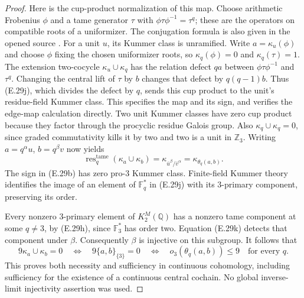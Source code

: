 \begin{proof}
Here is the cup-product normalization of this map.
Choose arithmetic Frobenius $\phi$ and a tame generator
$\tau$ with $\phi\tau\phi^{-1}=\tau^q$; these are the
operators on compatible roots of a uniformizer. The
conjugation formula is also given in the opened source
\cite[(8.2.2)]{E_BrinonConrad}.
For a unit $u$, its Kummer class is unramified. Write
$a=\kappa_u(\phi)$ and choose $\phi$ fixing the chosen
uniformizer roots, so $\kappa_q(\phi)=0$ and
$\kappa_q(\tau)=1$. The extension two-cocycle
$\kappa_u\cup\kappa_q$ has the relation defect $qa$
between $\phi\tau\phi^{-1}$ and $\tau^q$.
Changing the central lift of $\tau$ by $b$ changes that
defect by $q(q-1)b$. Thus (E.29j), which divides the
defect by $q$, sends this cup product to the unit's
residue-field Kummer class. This specifies the map and its
sign, and verifies the edge-map calculation directly.
Two unit Kummer classes have zero cup product because
they factor through the procyclic residue Galois group.
Also $\kappa_q\cup\kappa_q=0$, since graded commutativity
kills it by two and two is a unit in $\mathbb Z_3$.
Writing $a=q^\alpha u$, $b=q^\beta v$ now yields
\[
 \operatorname{res}^{\mathrm{tame}}_q
    (\kappa_a\cup\kappa_b)
    =\kappa_{\overline{u}^{\beta}/\overline{v}^{\alpha}}
    =\kappa_{\theta_q(a,b)}.                                 \tag{E.29k}
\]
The sign in (E.29b) has zero pro-$3$ Kummer class.
Finite-field Kummer theory identifies the image of an
element of $\mathbb F_q^*$ in (E.29j) with its
$3$-primary component, preserving its order.

Every nonzero $3$-primary element of $K_2^M(\mathbb Q)$
has a nonzero tame component at some $q\ne3$, by
(E.29h), since $\mathbb F_3^*$ has order two.
Equation (E.29k) detects that component under $\beta$.
Consequently $\beta$ is injective on this subgroup.
It follows that
\[
 9\kappa_a\cup\kappa_b=0
 \quad\Longleftrightarrow\quad
 9\{a,b\}_{\{3\}}=0
 \quad\Longleftrightarrow\quad
 o_3(\theta_q(a,b))\le9\quad\text{for every }q.               \tag{E.29l}
\]
This proves both necessity and sufficiency in continuous
cohomology, including sufficiency for the existence of a
continuous central cochain. No global inverse-limit
injectivity assertion was used.


\end{proof}
